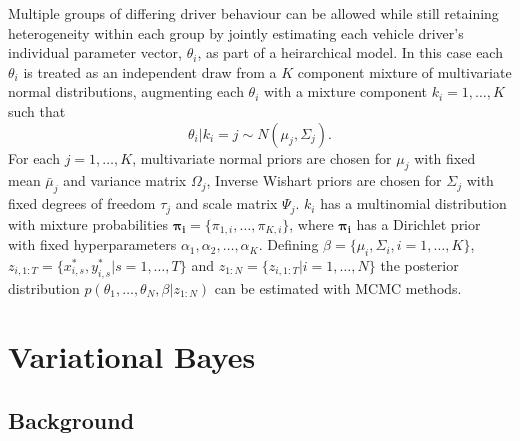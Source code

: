 \documentclass[12pt,a4paper]{article}\usepackage[]{graphicx}\usepackage[]{color}
\begin{document}
Multiple groups of differing driver behaviour can be allowed while still retaining heterogeneity within each group by jointly estimating each vehicle driver's individual parameter vector, $\theta_i$, as part of a heirarchical model. In this case each $\theta_i$ is treated as an independent draw from a $K$ component mixture of multivariate normal distributions, augmenting each $\theta_i$ with a mixture component $k_i = 1, \dots, K$ such that 
\begin{equation}
\theta_i | k_i = j \sim N(\mu_j, \Sigma_j).
\end{equation}
For each $j = 1, \dots, K$, multivariate normal priors are chosen for $\mu_j$ with fixed mean $\bar{\mu}_j$ and variance matrix $\Omega_j$, Inverse Wishart priors are chosen for $\Sigma_j$ with fixed degrees of freedom $\tau_j$ and scale matrix $\Psi_j$. $k_{i}$ has a multinomial distribution with mixture probabilities $\boldsymbol{\pi_i} = \{\pi_{1, i}, \dots, \pi_{K, i}\}$, where $\boldsymbol{\pi_i}$ has a Dirichlet prior with fixed hyperparameters $\alpha_1, \alpha_2, \dots, \alpha_K$. Defining $\beta = \{\mu_i, \Sigma_i, i = 1, \dots, K\}$, $z_{i, 1:T} = \{x^*_{i, s}, y^*_{i, s} | s = 1, \dots, T\}$ and $z_{1:N} = \{z_{i, 1:T} | i = 1, \dots, N\}$ the posterior distribution $p(\theta_1, \dots, \theta_N, \beta | z_{1:N})$ can be estimated with MCMC methods.

\section{Variational Bayes}

\subsection{Background}
\end{document}
